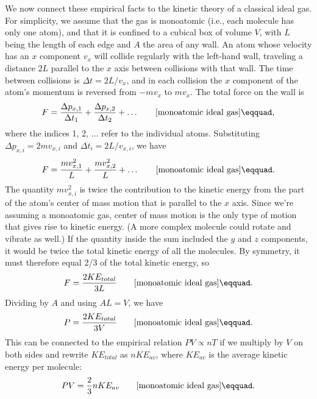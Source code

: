 We now connect these empirical facts to the kinetic theory
of a classical ideal gas. For simplicity, we assume that the gas is
monoatomic (i.e., each molecule has only one atom), and that
it is confined to a cubical box of volume $V$, with $L$ being
the length of each edge and $A$ the area of any wall. An atom
whose velocity has an $x$ component $v_x$ will collide regularly
with the left-hand wall, traveling a distance $2L$ parallel to
the $x$ axis between collisions with that wall. The time between collisions
is $\Delta t=2L/v_x$, and in each collision the $x$ component of
the atom's momentum is reversed from $-mv_x$  to $mv_x$. The total
force on the wall is
\begin{equation*}
        F =   \frac{\Delta p_{x,1}}{\Delta t_1}+\frac{\Delta p_{x,2}}{\Delta t_2}+\ldots  \qquad \text{[monoatomic ideal gas]}\eqquad,
\end{equation*}
where the indices 1, 2, $\ldots$ refer to the individual atoms.
Substituting $\Delta p_{x,i}=2mv_{x,i}$ and $\Delta t_i=2L/v_{x,i}$, we
have
\begin{equation*}
                F        =  \frac{mv_{x,1}^2}{L}+\frac{mv_{x,2}^2}{L}+\ldots \qquad \text{[monoatomic ideal gas]}\eqquad.
\end{equation*}
The quantity $mv_{x,i}^2$ is twice the contribution to the
kinetic energy from the part of the atom's center of mass
motion that is parallel to the $x$ axis. Since we're assuming
a monoatomic gas, center of mass motion is the only type of
motion that gives rise to kinetic energy. (A more complex
molecule could rotate and vibrate as well.) If the quantity
inside the sum included the $y$ and $z$ components, it would be
twice the total kinetic energy of all the molecules. By
symmetry, it must therefore equal 2/3 of the total kinetic
energy, so
\begin{equation*}
        F        =   \frac{2KE_{total}}{3L} \qquad \text{[monoatomic ideal gas]}\eqquad.
\end{equation*}
Dividing by $A$ and using $AL=V$, we have
\begin{equation*}
        P        =   \frac{2KE_{total}}{3V} \qquad \text{[monoatomic ideal gas]}\eqquad.
\end{equation*}
This can be connected to the empirical relation $PV \propto nT$ if we
multiply by $V$ on both sides and rewrite $KE_{total}$ as $nKE_{av}$,
where $KE_{av}$ is the average kinetic energy per
molecule:
\begin{equation*}
        PV        =          \frac{2}{3}nKE_{av} \qquad \text{[monoatomic ideal gas]}\eqquad.
\end{equation*}
